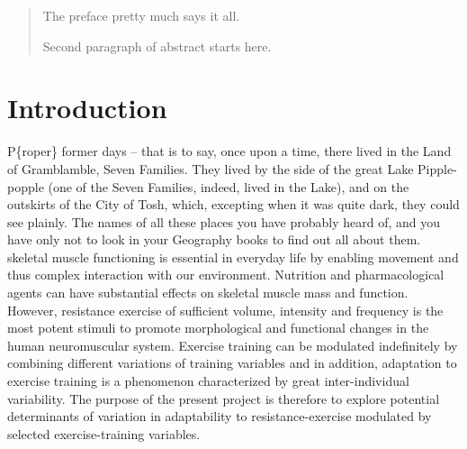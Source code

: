 \documentclass[twoside,10pt]{gihclass} %
\begin{document}
  \begin{abstract}
    The preface pretty much says it all.
    
    \par
    
    Second paragraph of abstract starts here.
  \end{abstract}



  \hypersetup{linkcolor=black}
  \setcounter{tocdepth}{2}
  \tableofcontents

  \listoftables

  \listoffigures




\mainmatter %
\pagestyle{fancyplain} %

\setcounter{DefaultLines}{3}

\hypertarget{introduction}{%
\chapter{Introduction}\label{introduction}}

\lettrine[findent=3pt, nindent=0pt, ante=\rlap{\color{LightSalmon!50}\rule[-0.55\LettrineHeight]{\LettrineWidth}{0.65\LettrineHeight}} ]{P}\{roper\} former days -- that is to say, once upon a time, there lived in the Land of Gramblamble, Seven Families. They lived by the side of the great Lake Pipple-popple (one of the Seven Families, indeed, lived in the Lake), and on the outskirts of the City of Tosh, which, excepting when it was quite dark, they could see plainly. The names of all these places you have probably heard of, and you have only not to look in your Geography books to find out all about them.
skeletal muscle functioning is essential in everyday life by enabling movement and thus complex interaction with our environment. Nutrition and pharmacological agents can have substantial effects on skeletal muscle mass and function. However, resistance exercise of sufficient volume, intensity and frequency is the most potent stimuli to promote morphological and functional changes in the human neuromuscular system. Exercise training can be modulated indefinitely by combining different variations of training variables and in addition, adaptation to exercise training is a phenomenon characterized by great inter-individual variability. The purpose of the present project is therefore to explore potential determinants of variation in adaptability to resistance-exercise modulated by selected exercise-training variables.
\end{document}
